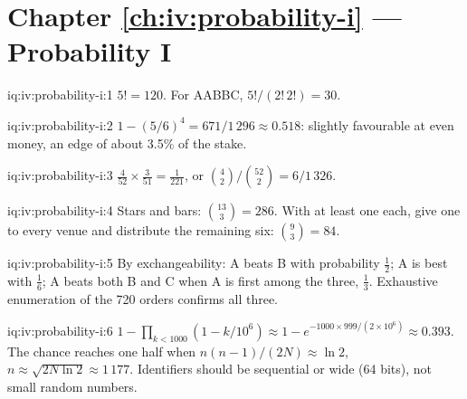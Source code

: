 \section*{Chapter \ref{ch:iv:probability-i} --- Probability I}

\begin{solution}{iq:iv:probability-i:1}
$5! = 120$. For AABBC, $5!/(2!\,2!) = 30$.
\end{solution}

\begin{solution}{iq:iv:probability-i:2}
$1 - (5/6)^4 = 671/1\,296 \approx 0.518$: slightly favourable at even money, an edge of about 3.5\% of the stake.
\end{solution}

\begin{solution}{iq:iv:probability-i:3}
$\tfrac4{52} \times \tfrac3{51} = \tfrac1{221}$, or $\binom42/\binom{52}2 = 6/1\,326$.
\end{solution}

\begin{solution}{iq:iv:probability-i:4}
Stars and bars: $\binom{13}3 = 286$. With at least one each, give one to every venue and distribute the remaining
six: $\binom93 = 84$.
\end{solution}

\begin{solution}{iq:iv:probability-i:5}
By exchangeability: A beats B with probability $\tfrac12$; A is best with $\tfrac16$; A beats both B and C when A is
first among the three, $\tfrac13$. Exhaustive enumeration of the 720 orders confirms all three.
\end{solution}

\begin{solution}{iq:iv:probability-i:6}
$1 - \prod_{k<1000}(1 - k/10^6) \approx 1 - e^{-1000 \times 999/(2 \times 10^6)} \approx 0.393$. The chance reaches
one half when $n(n-1)/(2N) \approx \ln 2$, $n \approx \sqrt{2N\ln 2} \approx 1\,177$. Identifiers should be
sequential or wide (64 bits), not small random numbers.
\end{solution}

